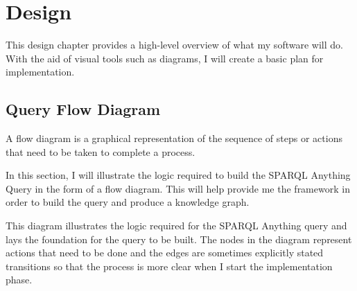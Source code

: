 \chapter{Design}
This design chapter provides a high-level overview of what my software will do. With the aid of visual tools such as diagrams, I will create a basic plan for implementation. 

\section{Query Flow Diagram}
\hspace{0.5cm} A flow diagram is a graphical representation of the sequence of steps or actions that need to be taken to complete a process. \cite{flowchart}

In this section, I will illustrate the logic required to build the SPARQL Anything Query in the form of a flow diagram. This will help provide me the framework in order to build the query and produce a knowledge graph.

\bigskip
\begin{center}
\end{center}

This diagram illustrates the logic required for the SPARQL Anything query and lays the foundation for the query to be built. The nodes in the diagram represent actions that need to be done and the edges are sometimes explicitly stated transitions so that the process is more clear when I start the implementation phase.

